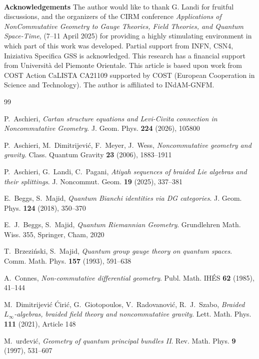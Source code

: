 \documentclass[12pt]{article}
\numberwithin{equation}{section}
\theoremstyle{plain}
\theoremstyle{definition}
\theoremstyle{remark}
\begin{document}
\phantom{M}\\


{\bf Acknowledgements}
The author would like to thank G. Landi for fruitful discussions, and the organizers of the CIRM conference {\sl Applications of NonCommutative Geometry to Gauge Theories, Field Theories, and Quantum Space-Time}, (7–11 April 2025) for providing a highly stimulating environment in which part of this work was developed.
Partial support from INFN, CSN4, Iniziativa
Specifica GSS is acknowledged.  This research has a financial 
support from Universit\`a del Piemonte Orientale. This article is based upon work from COST Action CaLISTA CA21109 supported by COST (European Cooperation in Science and Technology). The author is
affiliated to INdAM-GNFM.


 
\begin{thebibliography}{99}

P.~Aschieri,
\emph{Cartan structure equations and Levi-Civita connection in Noncommutative Geometry}.
J. Geom. Phys. \textbf{224} (2026), 105800

P.~Aschieri, M.~Dimitrijević, F.~Meyer, J.~Wess,
\emph{Noncommutative geometry and gravity}.
Class. Quantum Gravity \textbf{23} (2006), 1883--1911

P.~Aschieri, G.~Landi, C.~Pagani,
\emph{Atiyah sequences of braided Lie algebras and their splittings}.
J. Noncommut. Geom. \textbf{19} (2025), 337--381

E.~Beggs, S.~Majid,
\emph{Quantum Bianchi identities via DG categories}.
J. Geom. Phys. \textbf{124} (2018), 350--370

E.~J.~Beggs, S.~Majid,
\emph{Quantum Riemannian Geometry}.
Grundlehren Math. Wiss. 355,
Springer, Cham, 2020

T.~Brzeziński, S.~Majid,
\emph{Quantum group gauge theory on quantum spaces}.
Comm. Math. Phys. \textbf{157} (1993), 591--638

A.~Connes,
\emph{Non-commutative differential geometry}.
Publ. Math. IHÉS \textbf{62} (1985), 41--144

M.~Dimitrijević Ćirić, G.~Giotopoulos, V.~Radovanović, R.~J.~Szabo,
\emph{Braided $L_\infty$-algebras, braided field theory and noncommutative gravity}.
Lett. Math. Phys. \textbf{111} (2021), Article 148

M.~\DJ urđević,
\emph{Geometry of quantum principal bundles II}.
Rev. Math. Phys. \textbf{9} (1997), 531--607


\end{thebibliography}
\end{document}
